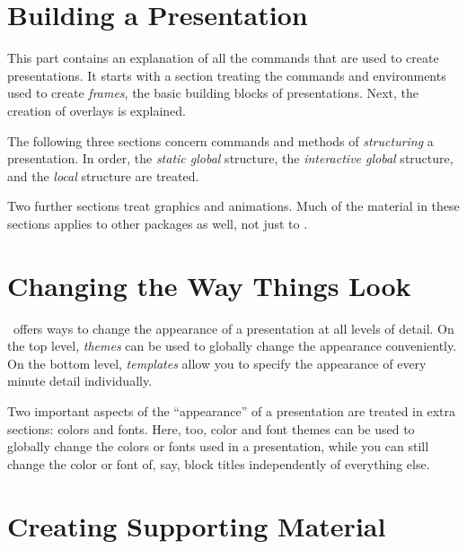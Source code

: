 \documentclass{ltxdoc}
\begin{document}
\part{Building a Presentation}

This part contains an explanation of all the commands that are used to create presentations. It starts with a section treating the commands and environments used to create \emph{frames}, the basic building blocks of presentations. Next, the creation of overlays is explained.

The following three sections concern commands and methods of \emph{structuring} a presentation. In order, the \emph{static global} structure, the \emph{interactive global} structure, and the \emph{local} structure are treated.

Two further sections treat graphics and animations. Much of the material in these sections applies to other packages as well, not just to \beamer.











\part{Changing the Way Things Look}

\beamer\ offers ways to change the appearance of a presentation at all levels of detail. On the top level, \emph{themes} can be used to globally change the appearance conveniently. On the bottom level, \emph{templates} allow you to specify the appearance of every minute detail individually.

Two important aspects of the ``appearance'' of a presentation are treated in extra sections: colors and fonts. Here, too, color and font themes can be used to globally change the colors or fonts used in a presentation, while you can still change the color or font of, say, block titles independently of everything else.








\part{Creating Supporting Material}
\end{document}
